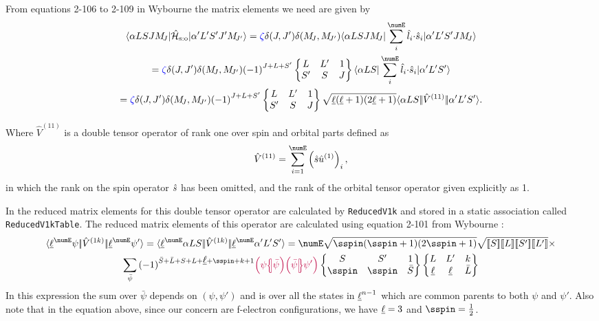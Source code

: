 \documentclass{article}
\newcommand{\codetext}[1]{{\color{BlueViolet} \texttt{#1}}}
\begin{document}
    From equations 2-106 to 2-109 in Wybourne \cite{wybourne_electrostatic_1963} the matrix elements we need are given by
    \begin{multline} 
        \braopket{\alpha LSJ \Msub{J} }{\hamSpinOrbitSymbol}{\alpha' L'S'J'\Msub{J'}} = 
        \spinZeta
        \kronecker{J}{J'}
        \kronecker{\Msub{J}}{\Msub{J'}}
        \braopket{\alpha LSJ \Msub{J} }{\sum_i^{\numE} \dotp{\op{l}_i}{\op{s}_i}}{\alpha' L'S'J\Msub{J}} \\ 
        = \spinZeta \kronecker{J}{J'}
        \kronecker{\Msub{J}}{\Msub{J'}} \phaser{J+L+S'} 
            \sixj{L}{L'}{1}{S'}{S}{J} 
            \braopket{\alpha LS}{\sum_i^{\numE} \dotp{\op{l}_i}{\op{s}_i}}{\alpha' L'S'} \\
        = \spinZeta \kronecker{J}{J'}
        \kronecker{\Msub{J}}{\Msub{J'}} \phaser{J+L+S'} 
            \sixj{L}{L'}{1}{S'}{S}{J} 
            \sqrt{\lorb (\lorb + 1)(2\lorb + 1)} 
            \redbraopket{\alpha{LS}}{\op{V}^{(11)}}{\alpha'L'S'}.
    \end{multline}

    Where $\hat{V}^{(11)}$ is a double tensor operator of rank one over spin and orbital parts defined as 
    \begin{equation}
        \op{V}^{(11)} = \sum_{i=1}^\numE \left( \op{s}\op{u}^{(1)} \right)_i,
    \end{equation}
    in which the rank on the spin operator $\hat{s}$ has been omitted, and the rank of the orbital tensor operator given explicitly as 1.

    In \qlanth the reduced matrix elements for this double tensor operator are calculated by \codetext{ReducedV1k} and stored in a static association called \codetext{ReducedV1kTable}. The reduced matrix elements of this operator are calculated using equation 2-101 from Wybourne \cite{wybourne_spectroscopic_1965}:
    \begin{multline} 
        \redbraopket{\lorb^\numE \psi}{\op{V}^{(1k)}}{\lorb^\numE \psi'} = 
            \redbraopket{\lorb^\numE \alpha L S}
                {\op{V}^{(1k)}}
                {\lorb^\numE \alpha'L'S'} =
            \numE 
                \sqrt{\sspin (\sspin + 1) (2\sspin + 1)}
                \sqrt{\tpobraket{S}\tpobraket{L}\tpobraket{S'}\tpobraket{L'}} \times \\
        \sum_{\bar{\psi}}
            \phaser{\bar{S} + \bar{L} + S + L + \lorb + \sspin + k + 1}
            \cfpinv{\psi}{\bar{\psi}}
            \cfp{\bar{\psi}}{\psi'}
            \sixj{S}     {S'}     {1}
                {\sspin} {\sspin} {\bar{S}}
            \sixj{L}     {L'}    {k}
                {\lorb} {\lorb} {\bar{L}}
    \label{eqn:reducedV1k}
    \end{multline}
    In this expression the sum over $\bar{\psi}$ depends on $(\psi,\psi')$ and is over all the states in $\underbar{$\ell$}^{n-1}$ which are common parents to both $\psi$ and $\psi'$. Also note that in the equation above, since our concern are f-electron configurations, we have $\underbar{$\ell$} = 3$ and $\sspin = \frac{1}{2}$.
\end{document}
